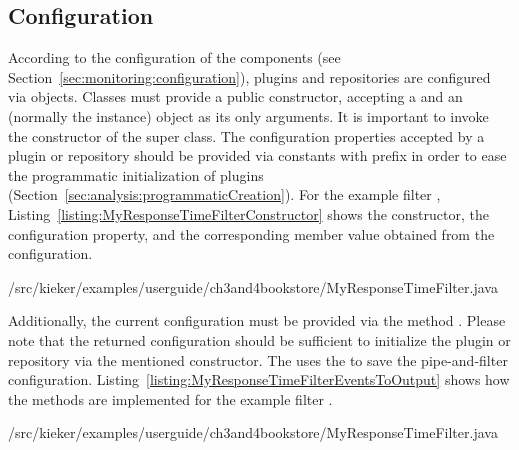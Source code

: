 \subsection{Configuration}\label{sec:analysis:configuration}

\noindent According to the %
configuration of the \KiekerMonitoringPart{} components (see Section~\ref{sec:monitoring:configuration}),
plugins and repositories are configured via  objects. Classes must %
provide a public constructor, accepting a  and an  (normally the  instance) object as %
its only arguments. It is important to invoke the constructor of the super class. %
The configuration properties accepted by a plugin or repository should be provided via  %
constants with prefix  in order to ease the %
programmatic initialization of plugins (Section~\ref{sec:analysis:programmaticCreation}). %
For the example filter ,
Listing~\ref{listing:MyResponseTimeFilterConstructor} shows the constructor,
the configuration property, and the corresponding member value obtained from the %
configuration.

\setJavaCodeListing
%
{\customComponentsBookstoreApplicationDir/src/kieker/examples/userguide/ch3and4bookstore/MyResponseTimeFilter.java}

\noindent Additionally, the %
current configuration must be provided via the method %
. Please note that the returned configuration %
should be sufficient to initialize the plugin or repository via the mentioned constructor. %
The  uses the  to %
save the pipe-and-filter configuration. Listing~\ref{listing:MyResponseTimeFilterEventsToOutput} %
shows how the methods are implemented for the example filter . %

\enlargethispage{1cm}

\setJavaCodeListing
%
{\customComponentsBookstoreApplicationDir/src/kieker/examples/userguide/ch3and4bookstore/MyResponseTimeFilter.java}

